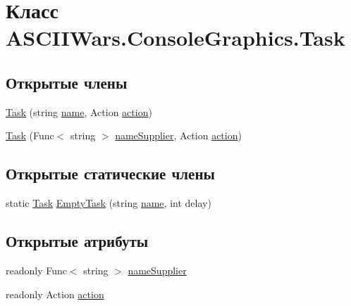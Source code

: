 \hypertarget{class_a_s_c_i_i_wars_1_1_console_graphics_1_1_task}{}\section{Класс A\+S\+C\+I\+I\+Wars.\+Console\+Graphics.\+Task}
\label{class_a_s_c_i_i_wars_1_1_console_graphics_1_1_task}
\subsection*{Открытые члены}
\begin{DoxyCompactItemize}
\item 
\hyperlink{class_a_s_c_i_i_wars_1_1_console_graphics_1_1_task_a2fe2e33110134ec07ed7ad5960976c6a}{Task} (string \hyperlink{class_a_s_c_i_i_wars_1_1_console_graphics_1_1_task_a235e892a10d43807b743c0edf8855df3}{name}, Action \hyperlink{class_a_s_c_i_i_wars_1_1_console_graphics_1_1_task_a9fcf12d48e7ae10b20db0828cedf4f7d}{action})
\item 
\hyperlink{class_a_s_c_i_i_wars_1_1_console_graphics_1_1_task_a083e89927241325952a8790824b79f83}{Task} (Func$<$ string $>$ \hyperlink{class_a_s_c_i_i_wars_1_1_console_graphics_1_1_task_ad5fe90ee93b95cf0be9ec7d6d533dabc}{name\+Supplier}, Action \hyperlink{class_a_s_c_i_i_wars_1_1_console_graphics_1_1_task_a9fcf12d48e7ae10b20db0828cedf4f7d}{action})
\end{DoxyCompactItemize}
\subsection*{Открытые статические члены}
\begin{DoxyCompactItemize}
\item 
static \hyperlink{class_a_s_c_i_i_wars_1_1_console_graphics_1_1_task}{Task} \hyperlink{class_a_s_c_i_i_wars_1_1_console_graphics_1_1_task_a199974d73498b9de5c95c3e90864a59b}{Empty\+Task} (string \hyperlink{class_a_s_c_i_i_wars_1_1_console_graphics_1_1_task_a235e892a10d43807b743c0edf8855df3}{name}, int delay)
\end{DoxyCompactItemize}
\subsection*{Открытые атрибуты}
\begin{DoxyCompactItemize}
\item 
readonly Func$<$ string $>$ \hyperlink{class_a_s_c_i_i_wars_1_1_console_graphics_1_1_task_ad5fe90ee93b95cf0be9ec7d6d533dabc}{name\+Supplier}
\item 
readonly Action \hyperlink{class_a_s_c_i_i_wars_1_1_console_graphics_1_1_task_a9fcf12d48e7ae10b20db0828cedf4f7d}{action}
\end{DoxyCompactItemize}
